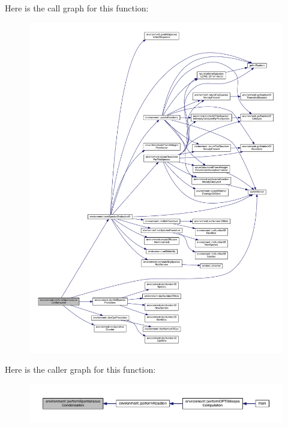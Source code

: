Here is the call graph for this function\-:\nopagebreak
\begin{figure}[H]
\begin{center}
\leavevmode
\includegraphics[width=350pt]{a00014_acc764a05297ae00db52360f3df5ed1d5_cgraph}
\end{center}
\end{figure}




Here is the caller graph for this function\-:\nopagebreak
\begin{figure}[H]
\begin{center}
\leavevmode
\includegraphics[width=350pt]{a00014_acc764a05297ae00db52360f3df5ed1d5_icgraph}
\end{center}
\end{figure}


